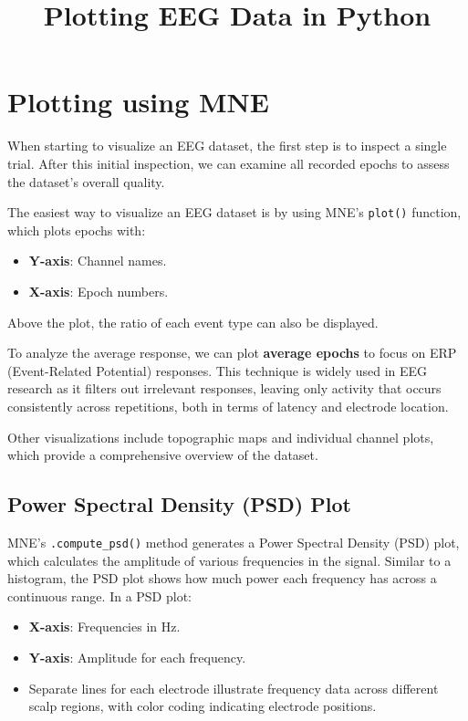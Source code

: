 \documentclass{article}
\title{Plotting EEG Data in Python}
\author{}
\date{}
\begin{document}
\maketitle

\section{Plotting using MNE}
When starting to visualize an EEG dataset, the first step is to inspect a single trial. After this initial inspection, we can examine all recorded epochs to assess the dataset’s overall quality. 

The easiest way to visualize an EEG dataset is by using MNE's \texttt{plot()} function, which plots epochs with:
\begin{itemize}
    \item \textbf{Y-axis}: Channel names.
    \item \textbf{X-axis}: Epoch numbers.
\end{itemize}
Above the plot, the ratio of each event type can also be displayed.

To analyze the average response, we can plot \textbf{average epochs} to focus on ERP (Event-Related Potential) responses. This technique is widely used in EEG research as it filters out irrelevant responses, leaving only activity that occurs consistently across repetitions, both in terms of latency and electrode location.

Other visualizations include topographic maps and individual channel plots, which provide a comprehensive overview of the dataset.

\subsection{Power Spectral Density (PSD) Plot}
MNE's \texttt{.compute\_psd()} method generates a Power Spectral Density (PSD) plot, which calculates the amplitude of various frequencies in the signal. Similar to a histogram, the PSD plot shows how much power each frequency has across a continuous range. In a PSD plot:
\begin{itemize}
    \item \textbf{X-axis}: Frequencies in Hz.
    \item \textbf{Y-axis}: Amplitude for each frequency.
    \item Separate lines for each electrode illustrate frequency data across different scalp regions, with color coding indicating electrode positions.
\end{itemize}
\end{document}
